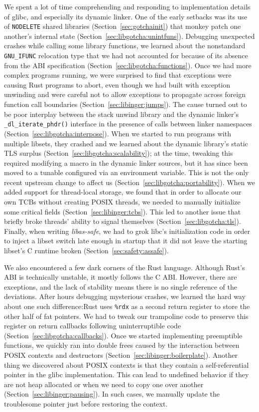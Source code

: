 We spent a lot of time comprehending and responding to implementation details of
glibc, and especially its dynamic linker.  One of the early setbacks was its use of
\texttt{NODELETE} shared libraries (Section~\ref{sec:gotchainit}) that monkey patch
one another's internal state (Section~\ref{sec:libgotcha:unintfuns}).  Debugging
unexpected crashes while calling some library functions, we learned about the
nonstandard \texttt{GNU\_IFUNC} relocation type that we had not accounted for because
of its absence from the ABI specification (Section~\ref{sec:libgotcha:functions}).
Once we had more complex programs running, we were surprised to find that exceptions
were causing Rust programs to abort, even though we had built with exception
unwinding and were careful not to allow exceptions to propagate across foreign
function call boundaries (Section~\ref{sec:libinger:jumps}).  The cause turned out
to be poor interplay between the stack unwind library and the dynamic linker's
\texttt{\_dl\_iterate\_phdr()} interface in the presence of calls between linker
namespaces (Section~\ref{sec:libgotcha:interpose}).  When we started to run programs
with multiple libsets, they crashed and we learned about the dynamic library's static
TLS surplus (Section~\ref{sec:libgotcha:scalability}); at the time, tweaking this
required modifying a macro in the dynamic linker sources, but it has since been moved
to a tunable configured via an environment variable.  This is not the only recent
upstream change to affect us (Section~\ref{sec:libgotcha:portability}).  When we
added support for thread-local storage, we found that in order to allocate our own
TCBs without creating POSIX threads, we needed to manually initialize some critical
fields (Section~\ref{sec:libinger:tcbs}).  This led to another issue that briefly
broke threads' ability to signal themselves (Section~\ref{sec:libgotcha:tls}).
Finally, when writing \textit{libas-safe}, we had to grok libc's initialization code
in order to inject a libset switch late enough in startup that it did not leave the
starting libset's C runtime broken (Section~\ref{sec:safety:assafe}).

We also encountered a few dark corners of the Rust language.  Although Rust's ABI is
technically unstable, it mostly follows the C ABI.  However, there are exceptions,
and the lack of stability means there is no single reference of the deviations.
After hours debugging mysterious crashes, we learned the hard way about one such
difference:\@ Rust uses \texttt{\%rdx} as a second return register to store the other
half of fat pointers.  We had to tweak our trampoline code to preserve this register
on return callbacks following uninterruptible code
(Section~\ref{sec:libgotcha:callbacks}).  Once we started implementing preemptible
functions, we quickly ran into double frees caused by the interaction between POSIX
contexts and destructors (Section~\ref{sec:libinger:boilerplate}).  Another thing we
discovered about POSIX contexts is that they contain a self-referential pointer in
the glibc implementation.  This can lead to undefined behavior if they are not heap
allocated or when we need to copy one over another
(Section~\ref{sec:libinger:pausing}).  In such cases, we manually update the
troublesome pointer just before restoring the context.

